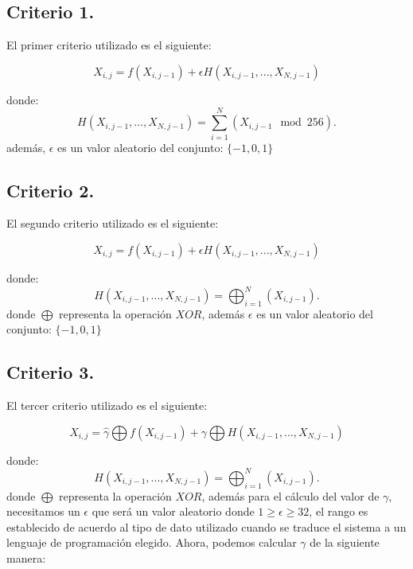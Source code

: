 \documentclass[12pt,3p]{elsarticle}
\begin{document}
\subsection{Criterio 1.}

El primer criterio utilizado es el siguiente:

\begin{equation}
X_{i,j}= f(X_{i,j-1})+ \epsilon  H(X_{i,j-1},...,X_{N,j-1})
\end{equation}

donde:
\begin{equation}
H(X_{i,j-1},...,X_{N,j-1}) = \sum_{i=1}^{N}(X_{i,j-1}\mod 256).
\end{equation}
además, $\epsilon$ es un valor aleatorio del conjunto: ${\{-1, 0, 1 \}}$




\subsection{Criterio 2.}

El segundo criterio utilizado es el siguiente:

\begin{equation}
X_{i,j}= f(X_{i,j-1})+ \epsilon  H(X_{i,j-1},...,X_{N,j-1})
\end{equation}

donde:
\begin{equation}
H(X_{i,j-1},...,X_{N,j-1}) = \bigoplus _{i=1}^{N}(X_{i,j-1}).
\end{equation}
donde $\bigoplus$ representa la operación $XOR$, además $\epsilon$ es un valor aleatorio del conjunto: ${\{-1, 0, 1 \}}$



\subsection{Criterio 3.}

El tercer criterio utilizado es el siguiente:

\begin{equation}
X_{i,j}= \hat{\gamma} \bigoplus f(X_{i,j-1})+ \gamma \bigoplus H(X_{i,j-1},...,X_{N,j-1})
\end{equation}

donde:
\begin{equation}
H(X_{i,j-1},...,X_{N,j-1}) = \bigoplus _{i=1}^{N}(X_{i,j-1}).
\end{equation}
donde $\bigoplus$ representa la operación $XOR$, además para el cálculo del valor de $\gamma$, necesitamos un $\epsilon$ que será un valor aleatorio donde $1 \geq \epsilon \geq 32$, el rango es establecido de acuerdo al tipo de dato utilizado cuando se traduce el sistema a un lenguaje de programación elegido. Ahora, podemos calcular $\gamma$ de la siguiente manera:
\end{document}
